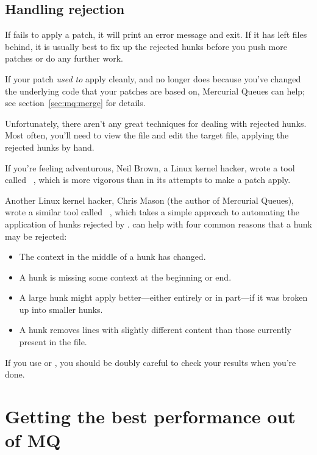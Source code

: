 \subsection{Handling rejection}

If  fails to apply a patch, it will print an error
message and exit.  If it has left  files behind, it is
usually best to fix up the rejected hunks before you push more patches
or do any further work.

If your patch \emph{used to} apply cleanly, and no longer does because
you've changed the underlying code that your patches are based on,
Mercurial Queues can help; see section~\ref{sec:mq:merge} for details.

Unfortunately, there aren't any great techniques for dealing with
rejected hunks.  Most often, you'll need to view the 
file and edit the target file, applying the rejected hunks by hand.

If you're feeling adventurous, Neil Brown, a Linux kernel hacker,
wrote a tool called ~\cite{web:wiggle}, which is more
vigorous than  in its attempts to make a patch apply.

Another Linux kernel hacker, Chris Mason (the author of Mercurial
Queues), wrote a similar tool called ~\cite{web:rej},
which takes a simple approach to automating the application of hunks
rejected by .   can help with four common
reasons that a hunk may be rejected:

\begin{itemize}
\item The context in the middle of a hunk has changed.
\item A hunk is missing some context at the beginning or end.
\item A large hunk might apply better---either entirely or in
  part---if it was broken up into smaller hunks.
\item A hunk removes lines with slightly different content than those
  currently present in the file.
\end{itemize}

If you use  or , you should be doubly
careful to check your results when you're done.

\section{Getting the best performance out of MQ}

